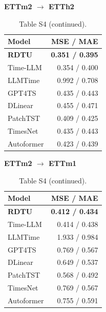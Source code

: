 \begin{table}[H]\centering\small
\caption*{Table S4 (continued).}
\begin{minipage}[t]{0.48\linewidth}\vspace{0pt}\centering\small
\textbf{ETTm2 $\to$ ETTh2}\par\smallskip
\begin{tabular}{lr}\toprule Model & MSE / MAE\\\midrule
\rowcolor{blue!5}
\textbf{RDTU} & \textbf{0.351 / 0.395}\\
Time-LLM & 0.354 / 0.400\\
LLMTime & 0.992 / 0.708\\
GPT4TS & 0.435 / 0.443\\
DLinear & 0.455 / 0.471\\
PatchTST & 0.409 / 0.425\\
TimesNet & 0.435 / 0.443\\
Autoformer & 0.423 / 0.439\\
\bottomrule\end{tabular}\end{minipage}\hfill\begin{minipage}[t]{0.48\linewidth}\vspace{0pt}\centering\small
\textbf{ETTm2 $\to$ ETTm1}\par\smallskip
\begin{tabular}{lr}\toprule Model & MSE / MAE\\\midrule
\rowcolor{blue!5}
\textbf{RDTU} & \textbf{0.412 / 0.434}\\
Time-LLM & 0.414 / 0.438\\
LLMTime & 1.933 / 0.984\\
GPT4TS & 0.769 / 0.567\\
DLinear & 0.649 / 0.537\\
PatchTST & 0.568 / 0.492\\
TimesNet & 0.769 / 0.567\\
Autoformer & 0.755 / 0.591\\
\bottomrule\end{tabular}\end{minipage}
\end{table}
